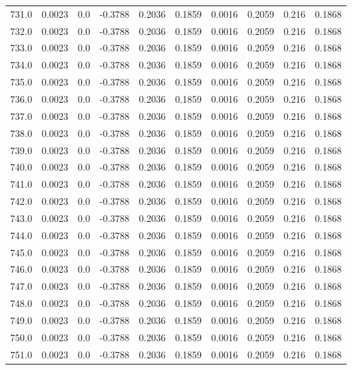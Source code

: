 \begin{longtable}{lrrrrrrrrr}
731.0 & 0.0023 & 0.0 & -0.3788 & 0.2036 & 0.1859 & 0.0016 & 0.2059 & 0.216 & 0.1868 \\
732.0 & 0.0023 & 0.0 & -0.3788 & 0.2036 & 0.1859 & 0.0016 & 0.2059 & 0.216 & 0.1868 \\
733.0 & 0.0023 & 0.0 & -0.3788 & 0.2036 & 0.1859 & 0.0016 & 0.2059 & 0.216 & 0.1868 \\
734.0 & 0.0023 & 0.0 & -0.3788 & 0.2036 & 0.1859 & 0.0016 & 0.2059 & 0.216 & 0.1868 \\
735.0 & 0.0023 & 0.0 & -0.3788 & 0.2036 & 0.1859 & 0.0016 & 0.2059 & 0.216 & 0.1868 \\
736.0 & 0.0023 & 0.0 & -0.3788 & 0.2036 & 0.1859 & 0.0016 & 0.2059 & 0.216 & 0.1868 \\
737.0 & 0.0023 & 0.0 & -0.3788 & 0.2036 & 0.1859 & 0.0016 & 0.2059 & 0.216 & 0.1868 \\
738.0 & 0.0023 & 0.0 & -0.3788 & 0.2036 & 0.1859 & 0.0016 & 0.2059 & 0.216 & 0.1868 \\
739.0 & 0.0023 & 0.0 & -0.3788 & 0.2036 & 0.1859 & 0.0016 & 0.2059 & 0.216 & 0.1868 \\
740.0 & 0.0023 & 0.0 & -0.3788 & 0.2036 & 0.1859 & 0.0016 & 0.2059 & 0.216 & 0.1868 \\
741.0 & 0.0023 & 0.0 & -0.3788 & 0.2036 & 0.1859 & 0.0016 & 0.2059 & 0.216 & 0.1868 \\
742.0 & 0.0023 & 0.0 & -0.3788 & 0.2036 & 0.1859 & 0.0016 & 0.2059 & 0.216 & 0.1868 \\
743.0 & 0.0023 & 0.0 & -0.3788 & 0.2036 & 0.1859 & 0.0016 & 0.2059 & 0.216 & 0.1868 \\
744.0 & 0.0023 & 0.0 & -0.3788 & 0.2036 & 0.1859 & 0.0016 & 0.2059 & 0.216 & 0.1868 \\
745.0 & 0.0023 & 0.0 & -0.3788 & 0.2036 & 0.1859 & 0.0016 & 0.2059 & 0.216 & 0.1868 \\
746.0 & 0.0023 & 0.0 & -0.3788 & 0.2036 & 0.1859 & 0.0016 & 0.2059 & 0.216 & 0.1868 \\
747.0 & 0.0023 & 0.0 & -0.3788 & 0.2036 & 0.1859 & 0.0016 & 0.2059 & 0.216 & 0.1868 \\
748.0 & 0.0023 & 0.0 & -0.3788 & 0.2036 & 0.1859 & 0.0016 & 0.2059 & 0.216 & 0.1868 \\
749.0 & 0.0023 & 0.0 & -0.3788 & 0.2036 & 0.1859 & 0.0016 & 0.2059 & 0.216 & 0.1868 \\
750.0 & 0.0023 & 0.0 & -0.3788 & 0.2036 & 0.1859 & 0.0016 & 0.2059 & 0.216 & 0.1868 \\
751.0 & 0.0023 & 0.0 & -0.3788 & 0.2036 & 0.1859 & 0.0016 & 0.2059 & 0.216 & 0.1868 \\

\end{longtable}
